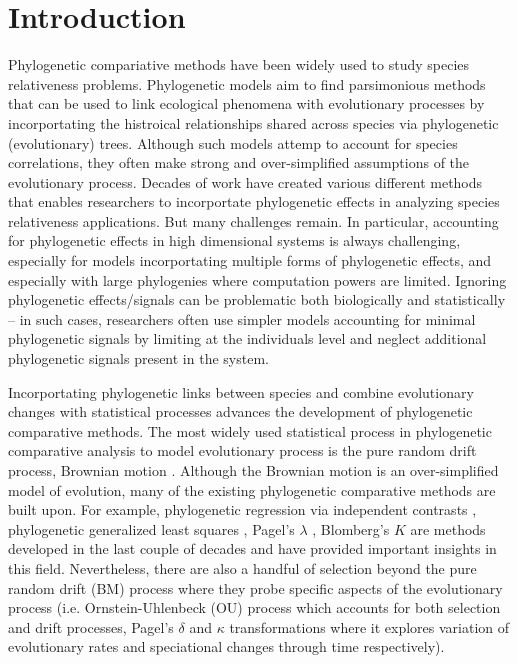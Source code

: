 \section{Introduction}

Phylogenetic compariative methods have been widely used to study species relativeness problems.
Phylogenetic models aim to find parsimonious methods that can be used to link ecological phenomena with evolutionary processes by incorportating the histroical relationships shared across species via phylogenetic (evolutionary) trees. 
Although such models attemp to account for species correlations, they often make strong and over-simplified assumptions of the evolutionary process. 
Decades of work have created various different methods that enables researchers to incorportate phylogenetic effects in analyzing species relativeness applications.
But many challenges remain.
In particular, accounting for phylogenetic effects in high dimensional systems is always challenging, especially for models incorportating multiple forms of phylogenetic effects, and especially with large phylogenies where computation powers are limited.
Ignoring phylogenetic effects/signals can be problematic both biologically and statistically \citep{felsenstein1985phylogenies, li2017statistical} -- in such cases, researchers often use simpler models accounting for minimal phylogenetic signals by limiting at the individuals level and neglect additional phylogenetic signals present in the system.

Incorportating phylogenetic links between species and combine evolutionary changes with statistical processes advances the development of phylogenetic comparative methods.
The most widely used statistical process in phylogenetic comparative analysis to model evolutionary process is the pure random drift process, Brownian motion \citep{felsenstein1973maximum}. 
Although the Brownian motion is an over-simplified model of evolution, many of the existing phylogenetic comparative methods are built upon.
For example, phylogenetic regression via independent contrasts \citep{felsenstein1985phylogenies}, phylogenetic generalized least squares \citep{grafen1989phylogenetic}, Pagel's $\lambda$ \citep{pagel1999inferring}, Blomberg's $K$ \citep{blomgerg2003} are methods developed in the last couple of decades and have provided important insights in this field. 
Nevertheless, there are also a handful of selection beyond the pure random drift (BM) process where they probe specific aspects of the evolutionary process (i.e. Ornstein-Uhlenbeck (OU) process which accounts for both selection and drift processes, Pagel's $\delta$ and $\kappa$ transformations where it explores variation of evolutionary rates and speciational changes through time respectively).


